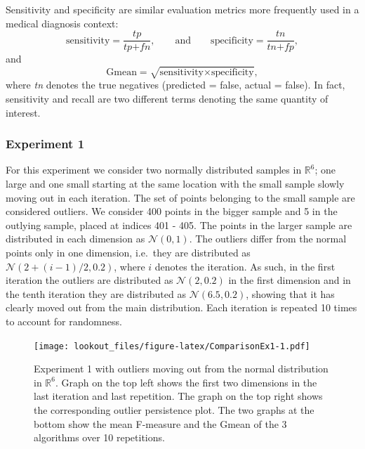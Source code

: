\documentclass[11pt,a4paper,]{article}
\theoremstyle{definition}
\theoremstyle{definition}
\theoremstyle{definition}
\theoremstyle{remark}
\begin{document}
Sensitivity and specificity are similar evaluation metrics more frequently used in a medical diagnosis context:
\begin{equation}\label{eq:ss}
    \text{sensitivity} = \frac{ \textit{tp} }{\textit{tp} + \textit{fn}}  , \qquad \text{and} \qquad \text{specificity} = \frac{\textit{tn}}{\textit{tn} + \textit{fp}}  ,
\end{equation}
and
\begin{equation}\label{eq:gmean}
    \text{Gmean} = \sqrt{ \text{sensitivity} \times \text{specificity}}  ,
\end{equation}
where \emph{tn} denotes the true negatives (predicted = false, actual = false). In fact, sensitivity and recall are two different terms denoting the same quantity of interest.

\hypertarget{sec:exp1}{%
\subsubsection{Experiment 1}\label{sec:exp1}}

For this experiment we consider two normally distributed samples in \(\mathbb{R}^6\); one large and one small starting at the same location with the small sample slowly moving out in each iteration. The set of points belonging to the small sample are considered outliers. We consider 400 points in the bigger sample and 5 in the outlying sample, placed at indices 401 - 405. The points in the larger sample are distributed in each dimension as \(\mathcal{N}(0, 1)\). The outliers differ from the normal points only in one dimension, i.e.~they are distributed as \(\mathcal{N}\left(2 + (i-1)/2, 0.2 \right)\), where \(i\) denotes the iteration. As such, in the first iteration the outliers are distributed as \(\mathcal{N}\left(2 , 0.2 \right)\) in the first dimension and in the tenth iteration they are distributed as \(\mathcal{N}\left(6.5 , 0.2 \right)\), showing that it has clearly moved out from the main distribution. Each iteration is repeated 10 times to account for randomness.

\begin{figure}
\centering
\texttt{[image: lookout\_files/figure-latex/ComparisonEx1-1.pdf]}
\caption{\label{fig:ComparisonEx1}Experiment 1 with outliers moving out from the normal distribution in \(\mathbb{R}^6\). Graph on the top left shows the first two dimensions in the last iteration and last repetition. The graph on the top right shows the corresponding outlier persistence plot. The two graphs at the bottom show the mean F-measure and the Gmean of the 3 algorithms over 10 repetitions.}
\end{figure}
\end{document}
